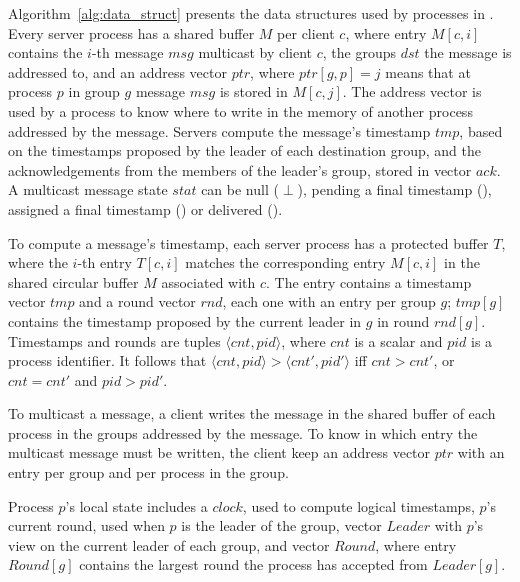 Algorithm~\ref{alg:data_struct} presents the data structures used by processes in \libname.
Every server process has a shared buffer $M$ per client $c$, where entry $M[c,i]$ contains the $i$-th message $msg$ multicast by client $c$, the groups $dst$ the message is addressed to, and an address vector $ptr$, where $ptr[g,p]=j$ means that at process $p$ in group $g$ message $msg$ is stored in $M[c,j]$. 
The address vector is used by a process to know where to write in the memory of another process addressed by the message.
Servers compute the message's timestamp $tmp$, based on the timestamps proposed by the leader of each destination group, and the acknowledgements from the members of the leader's group, stored in vector $ack$.
A multicast message state $stat$ can be null ($\perp$), pending a final timestamp (\mcast), assigned a final timestamp (\ordered) or delivered (\done).

To compute a message's timestamp, each server process has a protected buffer $T$, where the $i$-th entry $T[c,i]$ matches the corresponding entry $M[c,i]$ in the shared circular buffer $M$ associated with $c$.
The entry contains a timestamp vector $tmp$ and a round vector $rnd$, each one with an entry per group $g$; $tmp[g]$ contains the timestamp proposed by the current leader in $g$ in round $rnd[g]$.
Timestamps and rounds are tuples $\langle cnt,pid \rangle$, where $cnt$ is a scalar and $pid$ is a process identifier. It follows that $\langle cnt,pid \rangle > \langle cnt',pid' \rangle$ iff $cnt > cnt'$, or $cnt = cnt'$ and $pid > pid'$.

To multicast a message, a client writes the message in the shared buffer of each process in the groups addressed by the message.
To know in which entry the multicast message must be written, the client keep an address vector $ptr$ with an entry per group and per process in the group.

Process $p$'s local state includes a $clock$, used to compute logical timestamps, $p$'s current round, used when $p$ is the leader of the group, vector $Leader$ with $p$'s view on the current leader of each group, and vector $Round$, where entry $Round[g]$ contains the largest round the process has accepted from $Leader[g]$.











